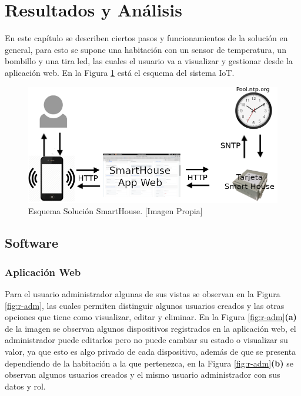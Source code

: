 \section{Resultados y Análisis}

En este capítulo se describen ciertos pasos y funcionamientos de la solución en general, para esto se supone una habitación con un sensor de temperatura, un bombillo y una tira led, las cuales el usuario va a visualizar y gestionar desde la aplicación web. En la Figura \ref{fig:iot} está el esquema del sistema IoT.

\begin{figure}[!t]
	\centering
	\caption[Esquema Solución SmartHouse.]{Esquema Solución SmartHouse. [Imagen Propia]}
	\label{fig:iot}
	\includegraphics[width=0.7\linewidth]{Imagenes/IOT}
\end{figure}

\subsection{Software}

\subsubsection{Aplicación Web}

Para el usuario administrador algunas de sus vistas se observan en la Figura \ref{fig:r-adm}, las cuales permiten distinguir algunos usuarios creados y las otras opciones que tiene como visualizar, editar y eliminar. En la Figura \ref{fig:r-adm}\textbf{(a)} de la imagen se observan algunos dispositivos registrados en la aplicación web, el administrador puede editarlos pero no puede cambiar su estado o visualizar su valor, ya que esto es algo privado de cada dispositivo, además de que se presenta dependiendo de la habitación a la que pertenezca, en la Figura \ref{fig:r-adm}\textbf{(b)} se observan algunos usuarios creados y el mismo usuario administrador con sus datos y rol.

